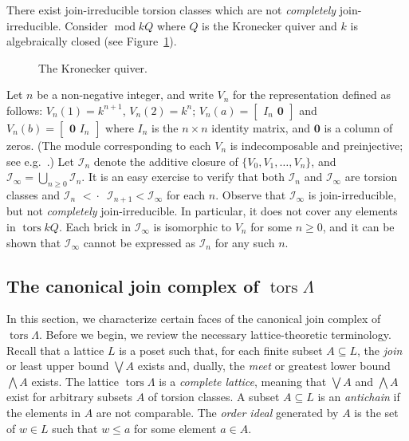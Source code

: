 \documentclass[ALCO,ThmDefs,Unicode,epreuves]{cedram}
\DeclareMathOperator{\tors}{tors}
\DeclareMathOperator{\module}{mod}
\newcommand{\calI}{\mathcal{I}}
\newcommand{\covered}{{\,\,<\!\!\!\!\cdot\,\,\,}}
\renewcommand{\Join}{\bigvee}
\newcommand{\Meet}{\bigwedge}
\renewcommand{\1}{\hat{1}}
\newcommand{\0}{\hat{0}}
\newcommand{\newword}[1]{\emph{#1}}
\begin{document}
\begin{remark}\label{kronecker}
\normalfont
There exist join-irreducible torsion classes which are not \emph{completely} join-irreducible.
Consider $\module kQ$ where $Q$ is the Kronecker quiver and $k$ is
algebraically closed (see Figure~\ref{fig: kronecker}).

\begin{figure}[htb]
 \caption{The Kronecker quiver.}
 \label{fig: kronecker}
 \end{figure}

Let $n$ be a non-negative integer, and write $V_n$ for the representation defined as follows:
$V_n(1) = k^{n+1}$, $V_n(2) = k^n$; $V_n(a)=\begin{bmatrix} I_n \,\, \mathbf{0}\end{bmatrix}$ and $V_n(b)=\begin{bmatrix} \mathbf{0}\,\, I_n\end{bmatrix}$ where $I_n$ is the $n\times n$ identity matrix, and $\mathbf{0}$ is a column of zeros.
(The module corresponding to each $V_n$ is indecomposable and preinjective; see e.g.~\cite[VIII.1]{ARS}.)
Let $\calI_n$ denote the additive closure of $\{V_0,V_1,\dotsc, V_n\}$, and $\calI_\infty=\bigcup\limits_{n\geq 0} \calI_n$.
It is an easy exercise to verify that both $\calI_n$ and $\calI_\infty$ are torsion classes and $\calI_n \covered \calI_{n+1}<\calI_\infty$ for each $n$.
Observe that $\calI_\infty$ is join-irreducible, but not \emph{completely} join-irreducible.
In particular, it does not cover any elements in $\tors kQ$.
Each brick in $\calI_\infty$ is isomorphic to $V_n$ for some $n\geq
0$, and it can be shown that $\calI_\infty$ cannot be expressed as $\calI_n$ for
any such $n$. 
\end{remark}


\subsection{The canonical join complex of \texorpdfstring{$\tors \Lambda$}{tors Lambda}}\label{canonical join complex}
In this section, we characterize certain faces of the canonical join complex of $\tors \Lambda$.
Before we begin, we review the necessary lattice-theoretic terminology.
Recall that a lattice $L$ is a poset such that, for each finite subset $A\subseteq L$, the \newword{join} or least upper bound $\Join A$ exists and, dually, the \newword{meet} or greatest lower bound $\Meet A$ exists.
The lattice $\tors \Lambda$ is a \newword{complete lattice}, meaning that $\Join A$ and $\Meet A$ exist for arbitrary subsets $A$ of torsion classes.
A subset $A\subseteq L$ is an \newword{antichain} if the elements in $A$ are not comparable.
The \newword{order ideal} generated by $A$ is the set of $w\in L$ such that $w\le a$ for some element $a\in A$.
\end{document}
